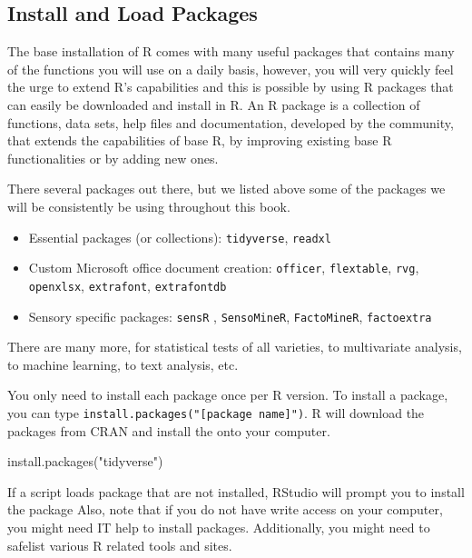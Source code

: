 \documentclass[
]{book}
\newenvironment{Shaded}{\begin{snugshade}}{\end{snugshade}}
\newcommand{\FunctionTok}[1]{\textcolor[rgb]{0.00,0.00,0.00}{#1}}
\newcommand{\NormalTok}[1]{#1}
\newcommand{\StringTok}[1]{\textcolor[rgb]{0.31,0.60,0.02}{#1}}
\begin{document}
\hypertarget{install-and-load-packages}{%
\subsection{Install and Load Packages}\label{install-and-load-packages}}

The base installation of R comes with many useful packages that contains many of the functions you will use on a daily basis, however, you will very quickly feel the urge to extend R's capabilities and this is possible by using R packages that can easily be downloaded and install in R. An R package is a collection of functions, data sets, help files and documentation, developed by the community, that extends the capabilities of base R, by improving existing base R functionalities or by adding new ones.

There several packages out there, but we listed above some of the packages we will be consistently be using throughout this book.

\begin{itemize}
\item
  Essential packages (or collections): \texttt{tidyverse}, \texttt{readxl}
\item
  Custom Microsoft office document creation: \texttt{officer}, \texttt{flextable}, \texttt{rvg}, \texttt{openxlsx}, \texttt{extrafont}, \texttt{extrafontdb}
\item
  Sensory specific packages: \texttt{sensR} , \texttt{SensoMineR}, \texttt{FactoMineR}, \texttt{factoextra}
\end{itemize}

There are many more, for statistical tests of all varieties, to multivariate analysis, to machine learning, to text analysis, etc.

You only need to install each package once per R version. To install a package, you can type \texttt{install.packages("{[}package\ name{]}")}. R will download the packages from CRAN and install the onto your computer.

\begin{Shaded}
\begin{Highlighting}[]
\FunctionTok{install.packages}\NormalTok{(}\StringTok{"tidyverse"}\NormalTok{)}
\end{Highlighting}
\end{Shaded}

If a script loads package that are not installed, RStudio will prompt you to install the package
Also, note that if you do not have write access on your computer, you might need IT help to install packages. Additionally, you might need to safelist various R related tools and sites.
\end{document}
